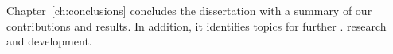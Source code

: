 Chapter~\ref{ch:conclusions} concludes the dissertation with a summary of our
contributions and results. In addition, it identifies topics for further .
research and development.
%
%
%
%
